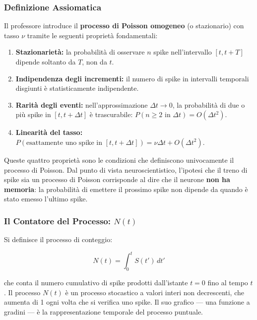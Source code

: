 \subsubsection{Definizione Assiomatica}

Il professore introduce il \textbf{processo di Poisson omogeneo} (o stazionario) con tasso $\nu$ tramite le seguenti proprietà fondamentali:

\begin{enumerate}
    \item \textbf{Stazionarietà:} la probabilità di osservare $n$ spike nell'intervallo $[t, t+T]$ dipende soltanto da $T$, non da $t$.
    \item \textbf{Indipendenza degli incrementi:} il numero di spike in intervalli temporali disgiunti è statisticamente indipendente.
    \item \textbf{Rarità degli eventi:} nell'approssimazione $\Delta t \to 0$, la probabilità di due o più spike in $[t, t+\Delta t]$ è trascurabile: $P(n \geq 2 \text{ in } \Delta t) = O(\Delta t^2)$.
    \item \textbf{Linearità del tasso:} $P(\text{esattamente uno spike in } [t, t+\Delta t]) = \nu \Delta t + O(\Delta t^2)$.
\end{enumerate}

Queste quattro proprietà sono le condizioni che definiscono univocamente il processo di Poisson. Dal punto di vista neuroscientistico, l'ipotesi che il treno di spike sia un processo di Poisson corrisponde al dire che il neurone \textbf{non ha memoria}: la probabilità di emettere il prossimo spike non dipende da quando è stato emesso l'ultimo spike.

\subsubsection{Il Contatore del Processo: $N(t)$}

Si definisce il processo di conteggio:

\begin{equation}
N(t) = \int_0^t S(t') \, dt'
\end{equation}

che conta il numero cumulativo di spike prodotti dall'istante $t=0$ fino al tempo $t$. Il processo $N(t)$ è un processo stocastico a valori interi non decrescenti, che aumenta di 1 ogni volta che si verifica uno spike. Il suo grafico — una funzione a gradini — è la rappresentazione temporale del processo puntuale.

